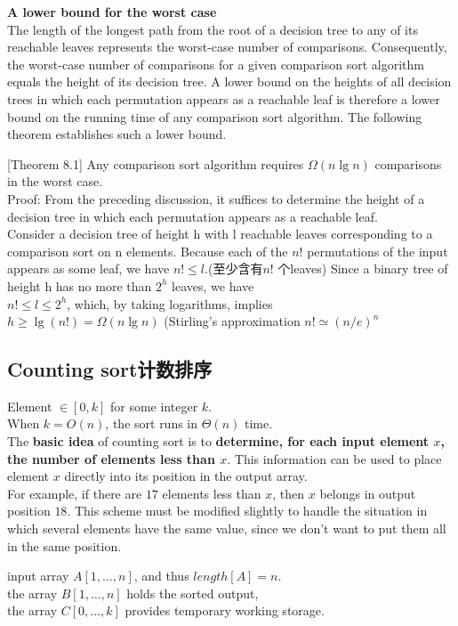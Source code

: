 \documentclass{article}
\begin{document}
\textbf{A lower bound for the worst case}\\
The length of the longest path from the root of a decision tree to any of its reachable leaves represents the worst-case number of comparisons. Consequently,
the worst-case number of comparisons for a given comparison sort algorithm equals the height of its decision tree. A lower bound on the heights of all decision trees in which each permutation appears as a reachable leaf is therefore a lower bound on the running time of any comparison sort algorithm. The following theorem establishes such a lower bound.

[Theorem 8.1] Any comparison sort algorithm requires $\Omega(n \lg n)$ comparisons in the worst case.\\
Proof: From the preceding discussion, it suffices to determine the height of a decision tree in which each permutation appears as a reachable leaf.\\
Consider a decision tree of height h with l reachable leaves corresponding to a comparison sort on n elements.
Because each of the $n!$ permutations of the input appears as some leaf, we have $n! \leq l$.(至少含有$n!$ 个leaves)
Since a binary tree of height h has no more than $2^h$ leaves, we have\\
$n! \leq l \leq 2^h$,
which, by taking logarithms, implies\\
$h \geq \lg (n!) = \Omega(n\lg n)$ (Stirling's approximation $n! \simeq (n/e)^n$

\subsection{Counting sort计数排序}
Element $\in [0, k]$ for some integer $k$. \\
When $k = O(n)$, the sort runs in $\Theta(n)$ time.\\
The \textbf{basic idea} of counting sort is to \textbf{determine, for each input element $x$, the number of elements less than $x$}.
This information can be used to place element $x$ directly into its position in the output array.\\
For example, if there are $17$ elements less than $x$, then $x$ belongs in output position $18$.
This scheme must be modified slightly to handle the situation in which several elements have the same value,
since we don't want to put them all in the same position.

input array $A[1,\ldots, n]$, and thus $length[A] = n$.\\
the array $B[1,\ldots,n]$ holds the sorted output, \\
the array $C[0,\ldots,k]$ provides temporary working storage.
\end{document}
